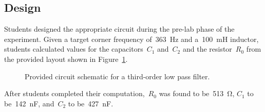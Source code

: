 \subsection{Design}
Students designed the appropriate circuit during the pre-lab phase of the
experiment.  Given a target corner frequency of~\SI{363}{\hertz} and
a~\SI{100}{\milli\henry} inductor, students calculated values for the
capacitors~$C_1$ and~$C_2$ and the resistor~$R_0$ from the provided layout
shown in Figure~\ref{f:prelabSchem}.
%
\begin{figure}[H]
	\centering
	
	\parbox{.6\textwidth}{
	\caption[Prelab Circuit Diagram]{Provided circuit schematic for a third-order low pass filter.}
	\label{f:prelabSchem}}
\end{figure}
%
After students completed their computation,~$R_0$ was found to
be~\SI{513}{\ohm}, $C_1$ to be~\SI{142}{\nano\farad}, and~$C_2$ to
be~\SI{427}{\nano\farad}.


\begin{figure}[H]
	\centering
	
\end{figure}

\begin{figure}[H]
	\centering
	
\end{figure}
